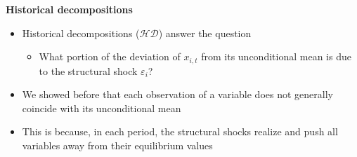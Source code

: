 \documentclass[10pt,handout]{beamer}
\begin{document}
\vspace{.1cm}

\begin{frame}
{\textbf{Historical decompositions}}

\begin{itemize}
\item Historical decompositions ($\mathcal{HD}$) answer the question

\begin{itemize}
\item What portion of the {{deviation {of $x_{i,t}$ }from its unconditional
mean is due to the structural shock $\varepsilon _{i}$}}?\medskip \pause
\end{itemize}

\item We showed before that each observation of a variable does not
generally coincide with its unconditional mean\medskip

\item This is because, in each period, the structural shocks realize and
push all variables away from their equilibrium values
\end{itemize}
\end{frame}

\vspace{0.1cm}

\everymath\expandafter{\the\everymath \color{note!80}}
\everydisplay\expandafter{\the\everydisplay \color{note!80}}%
\end{document}
